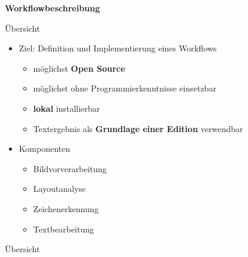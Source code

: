 \documentclass{bbawslides}
\begin{document}
\begin{bbawpart}{\Large\bf Workflowbeschreibung}
\end{bbawpart}

\begin{bbawslide}{Übersicht}
  \vspace*{7mm}%
  \centerslidestrue%
  \begin{itemize}
    \item Ziel: Definition und Implementierung eines Workflows
    \begin{itemize}\small
      \item möglichst \textbf{Open Source}
      \item möglichst ohne Programmierkenntnisse einsetzbar
      \item \textbf{lokal} installierbar 
      \item Textergebnis als \textbf{Grundlage einer Edition} verwendbar
    \end{itemize}
    \item Komponenten
    \begin{itemize}\small
      \item Bildvorverarbeitung
      \item Layoutanalyse
      \item Zeichenerkennung
      \item Textbearbeitung
    \end{itemize}
  \end{itemize}
\end{bbawslide}

\begin{bbawslide}{Übersicht}
  \vspace*{2mm}%
  \begin{center}
  \end{center}
\end{bbawslide}
\end{document}
